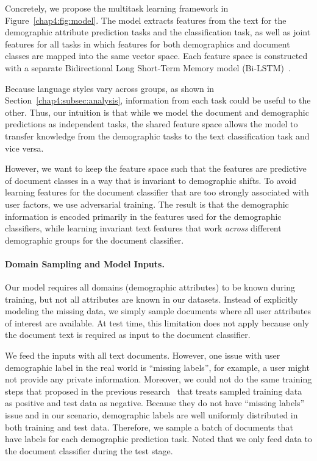 Concretely, we propose the multitask learning framework in Figure~\ref{chap4:fig:model}. 
The model extracts features from the text for the demographic attribute prediction tasks and the classification task, as well as joint features for all tasks in which features for both demographics and document classes are mapped into the same vector space.
Each feature space is constructed with a separate Bidirectional Long Short-Term Memory model (Bi-LSTM)~\cite{hochreiter1997long}.

Because language styles vary across groups, as shown in Section~\ref{chap4:subsec:analysis}, information from each task could be useful to the other.
Thus, our intuition is that while we model the document and demographic predictions as independent tasks, the shared feature space allows the model to transfer knowledge from the demographic tasks to the text classification task and vice versa. 

However, we want to keep the feature space such that
the features are predictive of document classes in a way that is invariant to demographic shifts. 
To avoid learning features for the document classifier that are too strongly associated with user factors, 
we use adversarial training.
The result is that the demographic information is encoded primarily in the features used for the demographic classifiers, while learning invariant text features that work {\em across} different demographic groups for the document classifier. 

\paragraph{Domain Sampling and Model Inputs.} 
Our model requires all domains (demographic attributes) to be known during training, but not all attributes are known in our datasets.
Instead of explicitly modeling the missing data,
we simply sample documents where all user attributes of interest are available.
At test time, this limitation does not apply because only the document text is required as input to the document classifier.

We feed the inputs with all text documents. However, one issue with user demographic label in the real world is ``missing labels'', for example, a user might not provide any private information. Moreover, we could not do the same training steps that proposed in the previous research~\cite{chen2016adversarial} that treats sampled training data as positive and test data as negative. Because they do not have ``missing labels'' issue and in our scenario, demographic labels are well uniformly distributed in both training and test data. Therefore, we sample a batch of documents that have labels for each demographic prediction task. Noted that we only feed data to the document classifier during the test stage.

